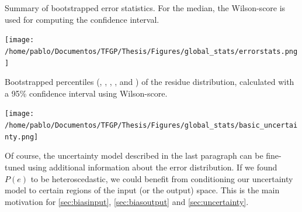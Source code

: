 %
\begin{table}
		\centering
		\caption{Summary of bootstrapped error statistics. For the median, the Wilson-score\cite{wilson1927probable} is used for computing the confidence interval.}
		\texttt{[image: /home/pablo/Documentos/TFGP/Thesis/Figures/global\_stats/errorstats.png]}
		\label{tab:errorstats}
\end{table}
\begin{table}
		\centering
		\caption{Bootstrapped percentiles (, , , ,  and ) of the residue distribution, calculated with a 95\% confidence interval using Wilson-score.}
		\texttt{[image: /home/pablo/Documentos/TFGP/Thesis/Figures/global\_stats/basic\_uncertainty.png]}
		\label{tab:basicuncertainty}
\end{table}
%
\indent Of course, the uncertainty model described in the last paragraph can be fine-tuned using additional information about the error distribution. If we found $P(e)$ to be heteroscedastic, we could benefit from conditioning our uncertainty model to certain regions of the input (or the output) space. This is the main motivation for \autoref{sec:biasinput}, \autoref{sec:biasoutput} and \autoref{sec:uncertainty}.\\
%
\clearpage
